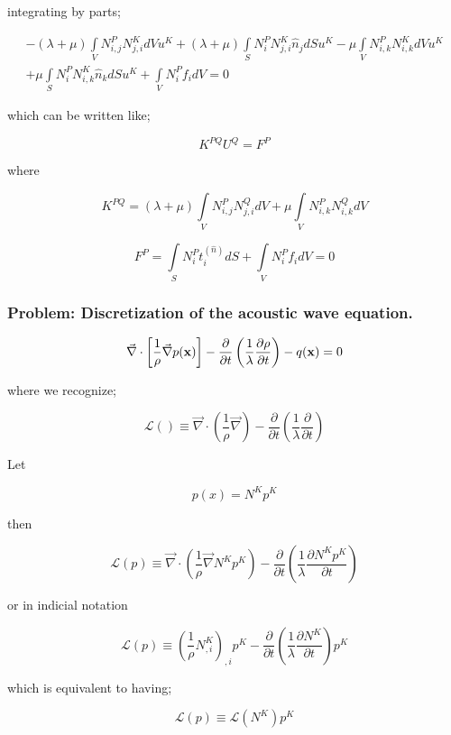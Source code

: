 integrating by parts;

\begin{align*}
- (\lambda  + \mu )\int\limits_V {N_{i,j}^PN_{j,i}^KdV{u^K} + (\lambda  + \mu )\int\limits_S {N_i^PN_{j,i}^K{{\hat n}_j}dS{u^K} - \mu \int\limits_V {N_{i,k}^PN_{i,k}^KdV{u^K}} } } \\
+ \mu \int\limits_S {N_i^PN_{i,k}^K{{\hat n}_k}dS{u^K}}  + \int\limits_V {N_i^P{f_i}dV = 0}
\end{align*}

which can be written like;


\[{K^{PQ}}{U^Q} = {F^P}\]

where

\[{K^{PQ}} = (\lambda  + \mu )\int\limits_V {N_{i,j}^PN_{j,i}^QdV}  + \mu \int\limits_V {N_{i,k}^PN_{i,k}^QdV} \]

\[{F^P} = \int\limits_S {N_i^Pt_i^{(\hat n)}dS + \int\limits_V {N_i^P{f_i}dV = 0} } \]

\subsubsection*{Problem: Discretization of the acoustic wave equation.}

\[\vec \nabla  \cdot \left[ {\frac{1}{\rho }\vec \nabla p(\vb{x})} \right] - \frac{\partial }{{\partial t}}\left( {\frac{1}{\lambda }\frac{{\partial \rho }}{{\partial t}}} \right) - q(\vb{x}) = 0\]

where we recognize;

\[\mathcal{L}() \equiv \vec \nabla  \cdot \left( {\frac{1}{\rho }\vec \nabla } \right) - \frac{\partial }{{\partial t}}\left( {\frac{1}{\lambda }\frac{\partial }{{\partial t}}} \right)\]

Let

\[p(x) = {N^K}{p^K}\]

then

\[\mathcal{L}(p) \equiv \vec \nabla  \cdot \left( {\frac{1}{\rho }\vec \nabla {N^K}{p^K}} \right) - \frac{\partial }{{\partial t}}\left( {\frac{1}{\lambda }\frac{{\partial {N^K}{p^K}}}{{\partial t}}} \right)\]

or in indicial notation

\[\mathcal{L}(p) \equiv {\left( {\frac{1}{\rho }N_{,i}^K} \right)_{,i}}{p^K} - \frac{\partial }{{\partial t}}\left( {\frac{1}{\lambda }\frac{{\partial {N^K}}}{{\partial t}}} \right){p^K}\]

which is equivalent to having;

\[\mathcal{L}(p) \equiv \mathcal{L}({N^K}){p^K}\]

